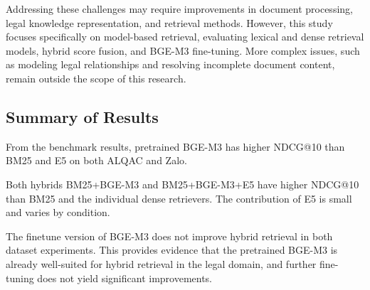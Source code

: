 Addressing these challenges may require improvements in document processing, legal knowledge representation, and retrieval methods. However, this study focuses specifically on model-based retrieval, evaluating lexical and dense retrieval models, hybrid score fusion, and BGE-M3 fine-tuning. More complex issues, such as modeling legal relationships and resolving incomplete document content, remain outside the scope of this research.



\subsection{Summary of Results}



From the benchmark results, pretrained BGE-M3 has higher NDCG@10 than BM25 and E5 on both ALQAC and Zalo.

Both hybrids BM25+BGE-M3 and BM25+BGE-M3+E5 have higher NDCG@10 than BM25 and the individual dense retrievers. The contribution of E5 is small and varies by condition.

The finetune version of BGE-M3 does not improve hybrid retrieval in both dataset experiments.
This provides evidence that the pretrained BGE-M3 is already well-suited for hybrid retrieval in the legal domain, and further fine-tuning does not yield significant improvements.
